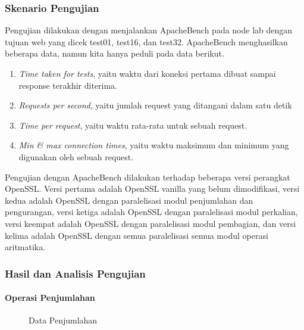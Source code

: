 \subsubsection{Skenario Pengujian}
Pengujian dilakukan dengan menjalankan ApacheBench pada node lab dengan tujuan web yang dicek test01, test16, dan test32. ApacheBench menghasilkan beberapa data, namun kita hanya peduli pada data berikut.
\begin{enumerate}[label=\roman*.]
  \item \textit{Time taken for tests}, yaitu waktu dari koneksi pertama dibuat sampai response terakhir diterima.
  \item \textit{Requests per second}, yaitu jumlah request yang ditangani dalam satu detik
  \item \textit{Time per request}, yaitu waktu rata-rata untuk sebuah request.
  \item \textit{Min \& max connection times}, yaitu waktu maksimum dan minimum yang digunakan oleh sebuah request.
\end{enumerate}

Pengujian dengan ApacheBench dilakukan terhadap beberapa versi perangkat OpenSSL. Versi pertama adalah OpenSSL vanilla yang belum dimodifikasi, versi kedua adalah OpenSSL dengan paralelisasi modul penjumlahan dan pengurangan, versi ketiga adalah OpenSSL dengan paralelisasi modul perkalian, versi keempat adalah OpenSSL dengan paralelisasi modul pembagian, dan versi kelima adalah OpenSSL dengan semua paralelisasi semua modul operasi aritmatika.

\subsubsection{Hasil dan Analisis Pengujian}

\paragraph{Operasi Penjumlahan}
\begin{figure}
  \centering
  \caption{Data Penjumlahan}
  \label{fig:add_data}
\end{figure}

